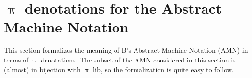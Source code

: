 \documentclass[a4paper,openany]{book}
\begin{document}
%

\section{$\uppi$ denotations for the Abstract Machine Notation}\label{sec:pi-den-for-amn}

This section formalizes the meaning of B's Abstract Machine Notation (AMN) in terms of $\uppi$ denotations. The subset of the AMN considered in this section is (almost) in bijection with $\uppi$ lib, so the formalization is quite easy to follow. 
\end{document}

